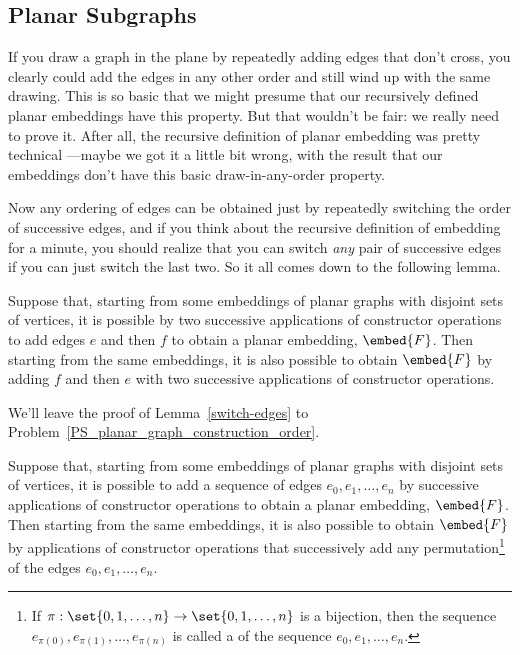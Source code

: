\begin{editingnotes}
\section{Planar Subgraphs}

If you draw a graph in the plane by repeatedly adding edges that don't
cross, you clearly could add the edges in any other order and still
wind up with the same drawing.  This is so basic that we might presume
that our recursively defined planar embeddings have this property.
But that wouldn't be fair: we really need to prove it.  After all, the
recursive definition of planar embedding was pretty technical ---maybe
we got it a little bit wrong, with the result that our embeddings
don't have this basic draw-in-any-order property.

Now any ordering of edges can be obtained just by repeatedly switching the
order of successive edges, and if you think about the recursive definition
of embedding for a minute, you should realize that you can switch
\emph{any} pair of successive edges if you can just switch the last two.
So it all comes down to the following lemma.

\begin{lemma}\label{switch-edges} Suppose that,
  starting from some embeddings of planar graphs with disjoint sets of
  vertices, it is possible by two successive applications of constructor
  operations to add edges $e$ and then $f$ to obtain a planar embedding,
  $\embed{F}$.  Then starting from the same embeddings, it is also
  possible to obtain $\embed{F}$ by adding $f$ and then $e$ with two
  successive applications of constructor operations.
\end{lemma}

We'll leave the proof of Lemma~\ref{switch-edges} to
Problem~\ref{PS_planar_graph_construction_order}.

\begin{corollary}\label{permute-edges} Suppose that, starting from some
  embeddings of planar graphs with disjoint sets of vertices, it is
  possible to add a sequence of edges $e_0,e_1,\dots,e_n$ by successive
  applications of constructor operations to obtain a planar embedding,
  $\embed{F}$.  Then starting from the same embeddings, it is also
  possible to obtain $\embed{F}$ by applications of constructor operations
  that successively add any permutation\footnote{If $\pi:\set{0,1,\dots,n} \to
    \set{0,1,\dots,n}$ is a bijection, then the sequence
    $e_{\pi(0)},e_{\pi(1)},\dots,e_{\pi(n)}$ is called a  of
    the sequence $e_0,e_1,\dots,e_n$.} of the edges $e_0,e_1,\dots,e_n$.
\end{corollary}


\end{editingnotes}
